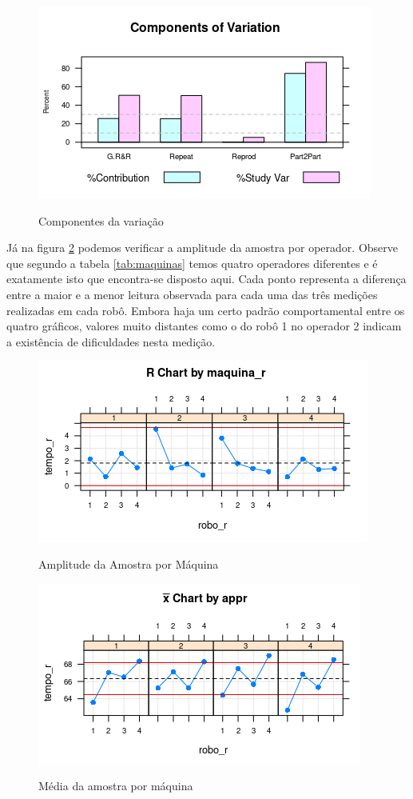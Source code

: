 \documentclass[
12pt,					%
openright,				%
oneside,				%
a4paper,				%
english,
brazil
]{ABNT/abntex2_report}
\begin{document}
\begin{figure}[H]
    \centering
    \caption{Componentes da variação}
    \includegraphics[scale = 0.9]{figures/graf1.png}
    \label{fig:compvar}

\end{figure}


Já na figura \ref{fig:r_maquina} podemos verificar a amplitude da amostra por operador. Observe que segundo a tabela \ref{tab:maquinas} temos quatro operadores diferentes e é exatamente isto que encontra-se disposto aqui. Cada ponto representa a diferença entre a maior e a menor leitura observada para cada uma das três medições realizadas em cada robô. Embora haja um certo padrão comportamental entre os quatro gráficos, valores muito distantes como o do robô 1 no operador 2 indicam a existência de dificuldades nesta medição. 
\begin{figure}[H]
	\centering
	\caption{Amplitude da Amostra por Máquina}
	\includegraphics[scale=0.9]{figures/graf3.png}
	\label{fig:r_maquina}
\end{figure}


\begin{figure}[H]
	\centering
	\caption{Média da amostra por máquina}
	\includegraphics[scale = 0.9]{figures/graf5.png}
	\label{fig:graf5}
\end{figure}
\end{document}
